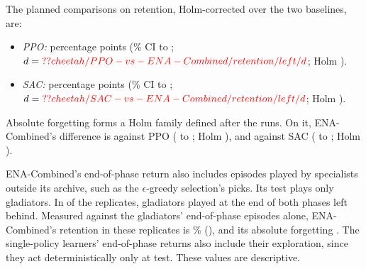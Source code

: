 The planned comparisons on retention, Holm-corrected over the two baselines, are:
\begin{itemize}
  \item \textit{PPO:}  percentage points (\% CI  to ; $d = \Res{cheetah/PPO-vs-ENA-Combined/retention/left/d}$; Holm ).
  \item \textit{SAC:}  percentage points (\% CI  to ; $d = \Res{cheetah/SAC-vs-ENA-Combined/retention/left/d}$; Holm ).
\end{itemize}
Absolute forgetting forms a Holm family defined after the runs. On it, ENA-Combined's difference is  against PPO ( to ; Holm ), and  against SAC ( to ; Holm ).

ENA-Combined's end-of-phase return also includes episodes played by specialists outside its archive, such as the $\epsilon$-greedy selection's picks. Its test plays only gladiators. In  of the  replicates, gladiators played at the end of both phases left behind. Measured against the gladiators' end-of-phase episodes alone, ENA-Combined's retention in these replicates is \% (), and its absolute forgetting . The single-policy learners' end-of-phase returns also include their exploration, since they act deterministically only at test. These values are descriptive.

